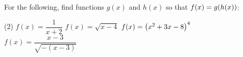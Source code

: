 \documentclass[../mathNotesPreamble]{subfiles}
\begin{document}
  \begin{ex*}
    For the following, find functions $g(x)$ and $h(x)$ so that $f(x)=g{\left(h(x)\right)}$:
    \begin{extasks}[after-item-skip=\stretch{1}](2)
      \task $f(x)=\dfrac{1}{x+2}$
      \task $f(x)=\sqrt{x-4}$
      \task $f(x)={\left(x^2+3x-8\right)}^4$
      \task $f(x)=\dfrac{x-3}{\sqrt{-(x-3)}}$
    \end{extasks}
  \end{ex*}
  \pagebreak

  

  \pagebreak
\end{document}
